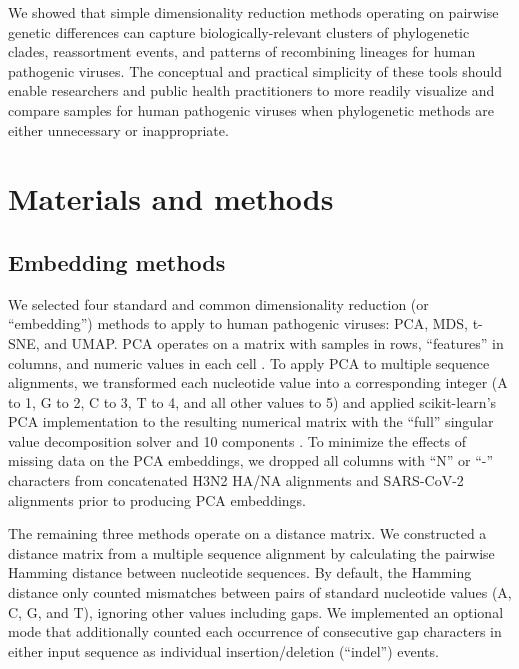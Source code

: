 \documentclass[10pt,letterpaper]{article}
\begin{document}
We showed that simple dimensionality reduction methods operating on pairwise genetic differences can capture biologically-relevant clusters of phylogenetic clades, reassortment events, and patterns of recombining lineages for human pathogenic viruses.
The conceptual and practical simplicity of these tools should enable researchers and public health practitioners to more readily visualize and compare samples for human pathogenic viruses when phylogenetic methods are either unnecessary or inappropriate.

\section*{Materials and methods}

\subsection*{Embedding methods}

We selected four standard and common dimensionality reduction (or ``embedding'') methods to apply to human pathogenic viruses: PCA, MDS, t-SNE, and UMAP.
PCA operates on a matrix with samples in rows, ``features'' in columns, and numeric values in each cell \cite{jolliffe_cadima_2016}.
To apply PCA to multiple sequence alignments, we transformed each nucleotide value into a corresponding integer (A to 1, G to 2, C to 3, T to 4, and all other values to 5) and applied scikit-learn's PCA implementation to the resulting numerical matrix with the ``full'' singular value decomposition solver and 10 components \cite{Pedregosa2011}.
To minimize the effects of missing data on the PCA embeddings, we dropped all columns with ``N'' or ``-'' characters from concatenated H3N2 HA/NA alignments and SARS-CoV-2 alignments prior to producing PCA embeddings.

The remaining three methods operate on a distance matrix.
We constructed a distance matrix from a multiple sequence alignment by calculating the pairwise Hamming distance between nucleotide sequences.
By default, the Hamming distance only counted mismatches between pairs of standard nucleotide values (A, C, G, and T), ignoring other values including gaps.
We implemented an optional mode that additionally counted each occurrence of consecutive gap characters in either input sequence as individual insertion/deletion (``indel'') events.
\end{document}
